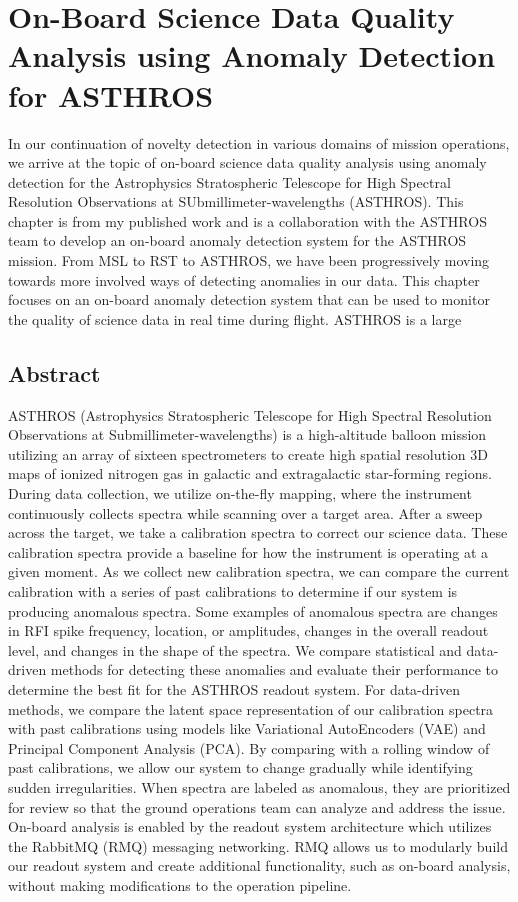 \chapter[On-Board Science Data Quality Analysis using Anomaly Detection for ASTHROS]{On-Board Science Data Quality Analysis using Anomaly Detection for ASTHROS}
\label{ch:spectra}
In our continuation of novelty detection in various domains of mission operations, we arrive at the topic of on-board science data quality analysis using anomaly detection for the Astrophysics Stratospheric Telescope for High Spectral Resolution Observations at SUbmillimeter-wavelengths (ASTHROS).
This chapter is from my published work \cite{horton2024board} and is a collaboration with the ASTHROS team to develop an on-board anomaly detection system for the ASTHROS mission.
From MSL to RST to ASTHROS, we have been progressively moving towards more involved ways of detecting anomalies in our data.
This chapter focuses on an on-board anomaly detection system that can be used to monitor the quality of science data in real time during flight.
ASTHROS is a large 

\section{Abstract}
ASTHROS (Astrophysics Stratospheric Telescope for High Spectral Resolution Observations at Submillimeter-wavelengths) is a high-altitude balloon mission utilizing an array of sixteen spectrometers to create high spatial resolution 3D maps of ionized nitrogen gas in galactic and extragalactic star-forming regions.
During data collection, we utilize on-the-fly mapping, where the instrument continuously collects spectra while scanning over a target area.
After a sweep across the target, we take a calibration spectra to correct our science data.
These calibration spectra provide a baseline for how the instrument is operating at a given moment.
As we collect new calibration spectra, we can compare the current calibration with a series of past calibrations to determine if our system is producing anomalous spectra.
Some examples of anomalous spectra are changes in RFI spike frequency, location, or amplitudes, changes in the overall readout level, and changes in the shape of the spectra.
We compare statistical and data-driven methods for detecting these anomalies and evaluate their performance to determine the best fit for the ASTHROS readout system. For data-driven methods, we compare the latent space representation of our calibration spectra with past calibrations using models like Variational AutoEncoders (VAE) and Principal Component Analysis (PCA).
By comparing with a rolling window of past calibrations, we allow our system to change gradually while identifying sudden irregularities.
When spectra are labeled as anomalous, they are prioritized for review so that the ground operations team can analyze and address the issue.
On-board analysis is enabled by the readout system architecture which utilizes the RabbitMQ (RMQ) messaging networking.
RMQ allows us to modularly build our readout system and create additional functionality, such as on-board analysis, without making modifications to the operation pipeline. 


